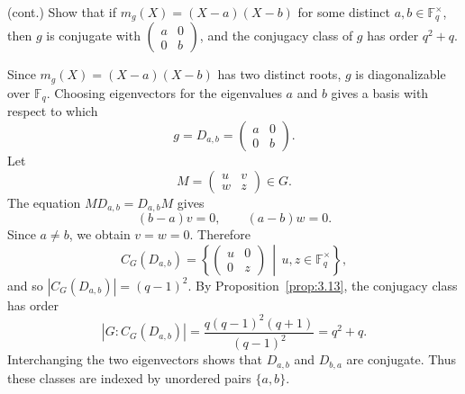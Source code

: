 \documentclass[../Odyssey_Project.tex]{subfiles}
\begin{document}
\begin{exercise}
\label{ex:16.11}
(cont.) Show that if $m_g(X) = (X - a)(X - b)$ for some distinct $a, b \in \mathbb{F}_q^\times$, then $g$ is conjugate with $\begin{pmatrix} a & 0 \\ 0 & b \end{pmatrix}$, and the conjugacy class of $g$ has order $q^2 + q$.
\end{exercise}
\begin{solution}
    Since $m_g(X)=(X-a)(X-b)$ has two distinct roots, $g$ is diagonalizable over $\mathbb{F}_q$. Choosing eigenvectors for the eigenvalues $a$ and $b$ gives a basis with respect to which
    \[
        g=D_{a,b}=
        \begin{pmatrix}
            a&0\\
            0&b
        \end{pmatrix}.
    \]
    Let
    \[
        M=
        \begin{pmatrix}
            u&v\\
            w&z
        \end{pmatrix}\in G.
    \]
    The equation $MD_{a,b}=D_{a,b}M$ gives
    \[
        (b-a)v=0,
        \qquad
        (a-b)w=0.
    \]
    Since $a\neq b$, we obtain $v=w=0$. Therefore
    \[
        C_G(D_{a,b})
        =
        \left\{
        \begin{pmatrix}
            u&0\\
            0&z
        \end{pmatrix}
        \,\middle|\,
        u,z\in\mathbb{F}_q^\times
        \right\},
    \]
    and so $|C_G(D_{a,b})|=(q-1)^2$. By Proposition~\ref{prop:3.13}, the conjugacy class has order
    \[
        |G : C_G(D_{a,b})|
        =
        \frac{q(q-1)^2(q+1)}{(q-1)^2}
        =
        q^2+q.
    \]
    Interchanging the two eigenvectors shows that $D_{a,b}$ and $D_{b,a}$ are conjugate. Thus these classes are indexed by unordered pairs $\{a,b\}$.
\end{solution}
\end{document}
